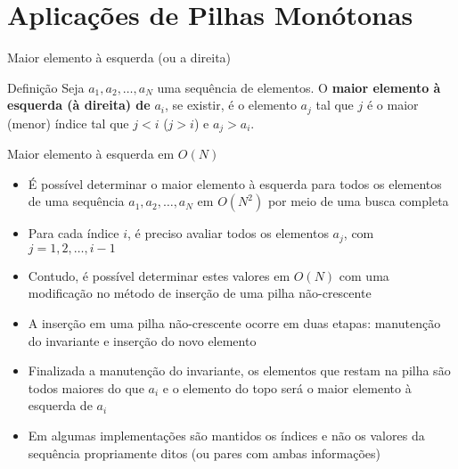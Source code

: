 \section{Aplicações de Pilhas Monótonas}

\begin{frame}[fragile]{Maior elemento à esquerda (ou a direita)}

    \begin{block}{Definição}
        Seja $a_1, a_2, \ldots, a_N$ uma sequência de elementos. O \textbf{maior elemento à esquerda (à direita) de} $a_i$, se existir, é o elemento $a_j$ tal que $j$ é o maior (menor) índice tal que $j < i$
        ($j > i$) e $a_j > a_i$.
    \end{block}

\end{frame}

\begin{frame}[fragile]{Maior elemento à esquerda em $O(N)$}

    \begin{itemize}
        \item É possível determinar o maior elemento à esquerda para todos os elementos de uma
            sequência $a_1, a_2, \ldots, a_N$ em $O(N^2)$ por meio de uma busca completa

        \item Para cada índice $i$, é preciso avaliar todos os elementos $a_j$, com $j = 1, 2, \ldots, i -1$

        \item Contudo, é possível determinar estes valores em $O(N)$ com uma modificação no método de
            inserção de uma pilha não-crescente

        \item A inserção em uma pilha não-crescente ocorre em duas etapas: manutenção do invariante e
            inserção do novo elemento

        \item Finalizada a manutenção do invariante, os elementos que restam na pilha são todos maiores
            do que $a_i$ e o elemento do topo será o maior elemento à esquerda de $a_i$

        \item Em algumas implementações são mantidos os índices e não os valores da sequência
            propriamente ditos (ou pares com ambas informações)
    \end{itemize}
\end{frame}

